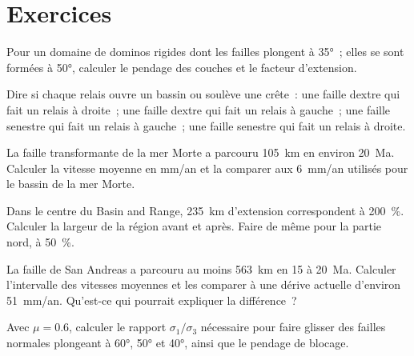 \section{Exercices}

\begin{exercise}[$\star$]\label{exo:b3:extension-strike-slip:1}
Pour un domaine de dominos rigides dont les failles plongent à \ang{35}~; elles se sont formées à
\ang{50}, calculer le pendage des couches et le facteur d'extension.
\end{exercise}

\begin{exercise}[$\star$]\label{exo:b3:extension-strike-slip:2}
Dire si chaque relais ouvre un bassin ou soulève une crête~: une faille dextre
qui fait un relais à droite~; une faille dextre qui fait un relais à gauche~; une faille senestre qui fait
un relais à gauche~; une faille senestre qui fait un relais à droite.
\end{exercise}

\begin{exercise}[$\star$]\label{exo:b3:extension-strike-slip:3}
La faille transformante de la mer Morte a parcouru \qty{105}{km} en environ \qty{20}{Ma}.
Calculer la vitesse moyenne en \unit{mm/an} et la comparer aux \qty{6}{mm/an}
utilisés pour le bassin de la mer Morte.
\end{exercise}

\begin{exercise}[$\star$]\label{exo:b3:extension-strike-slip:4}
Dans le centre du Basin and Range, \qty{235}{km} d'extension correspondent à
\qty{200}{\percent}. Calculer la largeur de la région avant et après. Faire
de même pour la partie nord, à \qty{50}{\percent}.
\end{exercise}

\begin{exercise}[$\star\star$]\label{exo:b3:extension-strike-slip:5}
La faille de San Andreas a parcouru au moins \qty{563}{km} en 15 à
\qty{20}{Ma}. Calculer l'intervalle des vitesses moyennes et les comparer à une
dérive actuelle d'environ \qty{51}{mm/an}. Qu'est-ce qui pourrait expliquer la différence~?
\end{exercise}

\begin{exercise}[$\star\star$]\label{exo:b3:extension-strike-slip:6}
Avec $\mu = 0.6$, calculer le rapport $\sigma_1/\sigma_3$ nécessaire pour faire glisser des failles normales
plongeant à \ang{60}, \ang{50} et \ang{40}, ainsi que le pendage de blocage.
\end{exercise}

